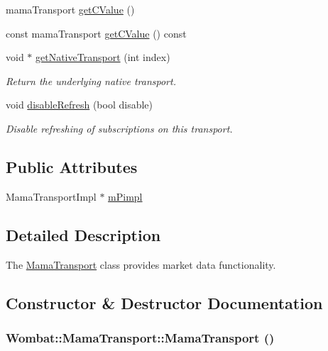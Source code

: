 \begin{DoxyCompactItemize}
mamaTransport \hyperlink{classWombat_1_1MamaTransport_ae7856a9d37de06f0aebb051056b77d60}{getCValue} ()
\item 
const mamaTransport \hyperlink{classWombat_1_1MamaTransport_a893a9111e4ea5adabaa12cf59f9b6fd8}{getCValue} () const 
\item 
void $\ast$ \hyperlink{classWombat_1_1MamaTransport_ac32d12abca9fb3f16dc587802980120c}{getNativeTransport} (int index)
\begin{DoxyCompactList}\small\item\em Return the underlying native transport. \item\end{DoxyCompactList}\item 
void \hyperlink{classWombat_1_1MamaTransport_ac69e1f4dd40f61fd321e403ec5e1d9ae}{disableRefresh} (bool disable)
\begin{DoxyCompactList}\small\item\em Disable refreshing of subscriptions on this transport. \item\end{DoxyCompactList}\end{DoxyCompactItemize}
\subsection*{Public Attributes}
\begin{DoxyCompactItemize}
\item 
MamaTransportImpl $\ast$ \hyperlink{classWombat_1_1MamaTransport_a19260481cebccd76b8ba3c6bfa86ce88}{mPimpl}
\end{DoxyCompactItemize}


\subsection{Detailed Description}
The \hyperlink{classWombat_1_1MamaTransport}{MamaTransport} class provides market data functionality. 

\subsection{Constructor \& Destructor Documentation}
\hypertarget{classWombat_1_1MamaTransport_abe9214f03456e224ad875c3fda215765}{
\subsubsection[{MamaTransport}]{\setlength{\rightskip}{0pt plus 5cm}Wombat::MamaTransport::MamaTransport ()}}
\label{classWombat_1_1MamaTransport_abe9214f03456e224ad875c3fda215765}


